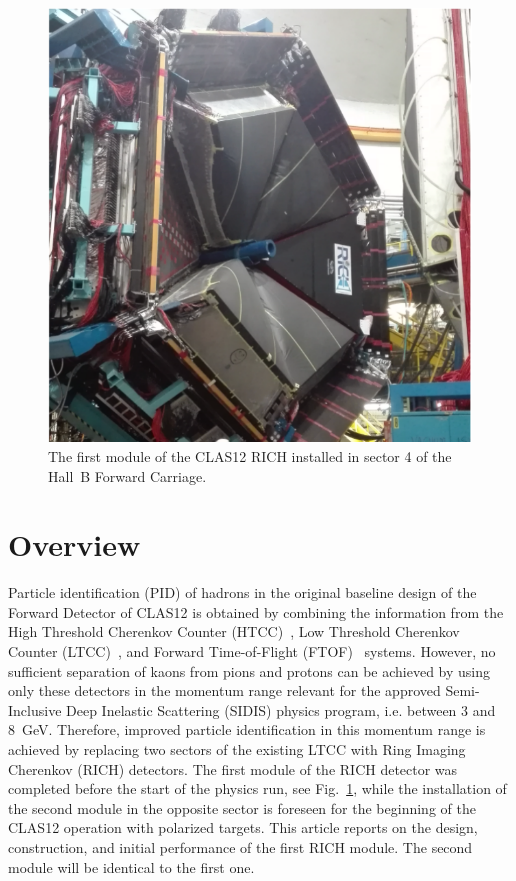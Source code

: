 \documentclass[5p,times,twocolumn]{elsarticle}
\begin{document}
\begin{figure}[th]
\begin{center}
\includegraphics[width=0.80\columnwidth]{RICH_Installed.pdf}
\end{center}
\caption{The first module of the CLAS12 RICH installed in sector 4 of the Hall~B Forward Carriage.}
\label{Fig:RICHPic}
\end{figure}

\section{Overview}

Particle identification (PID) of hadrons in the original baseline design of the Forward Detector of CLAS12 is obtained
by combining the information from the High Threshold Cherenkov Counter (HTCC)~\cite{REF:htcc-nim}, Low Threshold
Cherenkov Counter (LTCC)~\cite{REF:ltcc-nim}, and Forward Time-of-Flight (FTOF)~\cite{REF:ftof-nim} systems. However,
no sufficient separation of kaons from pions and protons can be achieved by using only these detectors in the
momentum range relevant for the approved Semi-Inclusive Deep Inelastic Scattering (SIDIS) physics program,
i.e. between 3 and 8~GeV. Therefore, improved particle identification in this momentum range is achieved by
replacing two sectors of the existing LTCC with Ring Imaging Cherenkov (RICH) detectors. The first module of the
RICH detector was completed before the start of the physics run, see Fig.~\ref{Fig:RICHPic}, while the installation
of the second module in the opposite sector is foreseen for the beginning of the CLAS12 operation with polarized
targets. This article reports on the design, construction, and initial performance of the first RICH module. The second
module will be identical to the first one.
\end{document}
